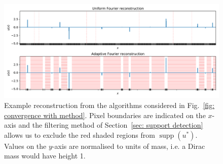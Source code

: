 \documentclass[smallextended]{svjour3}
\newcommand{\op}[1]{\operatorname{#1}}
\newcommand{\1}{\F{1}}
\begin{document}
\begin{figure}
		\includegraphics[width=.9\textwidth]{lasso_1D_recons}
		\caption{Example reconstruction from the algorithms considered in Fig.~\ref{fig: convergence with method}. Pixel boundaries are indicated on the $x$-axis and the filtering method of Section~\ref{sec: support detection} allows us to exclude the red shaded regions from $\op{supp}(u^*)$. Values on the $y$-axis are normalised to units of mass, i.e. a Dirac mass would have height 1.}\label{fig: example recon}
	\end{figure}
	
	
\end{document}
